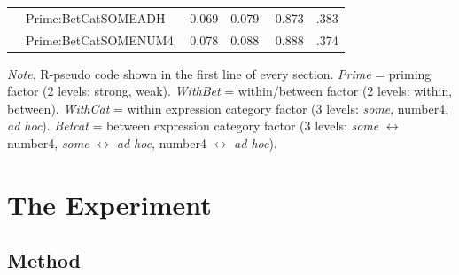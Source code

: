 \documentclass[10pt]{article}
\begin{document}
\begin{multicols}{2}
\begin{table}[ht]
\begin{center}
\begin{tabular}{llrrrr}
      & Prime:BetCatSOMEADH & -0.069 & 0.079 & -0.873 & .383 \\
      & Prime:BetCatSOMENUM4 & 0.078 & 0.088 & 0.888 & .374 \\
      \hline
    \end{tabular}
\end{center}
\emph{Note}. R-pseudo code shown in the first line of every section.
  \emph{Prime} = priming factor (2 levels: strong, weak).
  \emph{WithBet} = within/between factor (2 levels: within, between).
  \emph{WithCat} = within expression category factor (3 levels: \emph{some}, number4, \emph{ad hoc}).
  \emph{Betcat} = between expression category factor (3 levels: \emph{some} \(\leftrightarrow\) number4, \emph{some} \(\leftrightarrow\) \emph{ad hoc}, number4 \(\leftrightarrow\) \emph{ad hoc}).
\end{table}



\section{The Experiment}
\label{sec:experiment}



\subsection{Method}
\label{sec:method}


\end{multicols}
\end{document}
